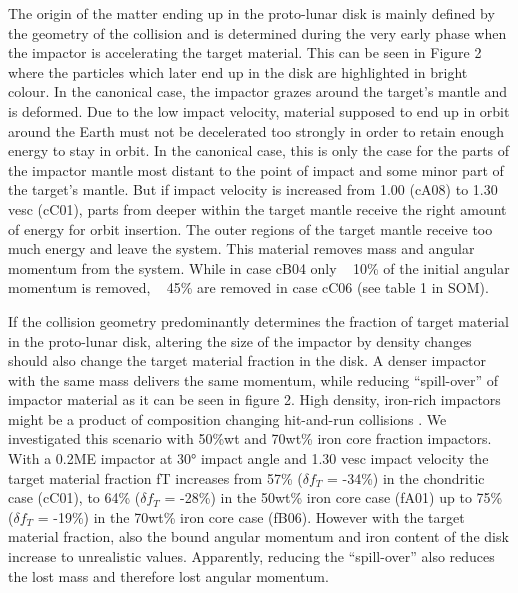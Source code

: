 The origin of the matter ending up in the proto-lunar disk is mainly defined by the geometry of the collision and is determined during the very early phase when the impactor is accelerating the target material. This can be seen in Figure 2 where the particles which later end up in the disk are highlighted in bright colour. In the canonical case, the impactor grazes around the target's mantle and is deformed. Due to the low impact velocity, material supposed to end up in orbit around the Earth must not be decelerated too strongly in order to retain enough energy to stay in orbit. In the canonical case, this is only the case for the parts of the impactor mantle most distant to the point of impact and some minor part of the target's mantle. But if impact velocity is increased from 1.00 (cA08) to 1.30 vesc (cC01), parts from deeper within the target mantle receive the right amount of energy for orbit insertion. The outer regions of the target mantle receive too much energy and leave the system. This material removes mass and angular momentum from the system. While in case cB04 only ~ 10\% of the initial angular momentum is removed, ~ 45\% are removed in case cC06 (see table 1 in SOM).

If the collision geometry predominantly determines the fraction of target material in the proto-lunar disk, altering the size of the impactor by density changes should also change the target material fraction in the disk. A denser impactor with the same mass delivers the same momentum, while reducing “spill-over” of impactor material as it can be seen in figure 2. High density, iron-rich impactors might be a product of composition changing hit-and-run collisions \citep{Asphaug:2010p3539}. We investigated this scenario with 50\%wt and 70wt\% iron core fraction impactors. With a 0.2ME impactor at 30° impact angle and 1.30 vesc impact velocity the target material fraction fT increases from 57\% ($\delta f_{T}$ = -34\%) in the chondritic case (cC01), to 64\% ($\delta f_{T}$ = -28\%) in the 50wt\% iron core case (fA01) up to 75\% ($\delta f_{T}$ = -19\%) in the 70wt\% iron core case (fB06). However with the target material fraction, also the bound angular momentum and iron content of the disk increase to unrealistic values. Apparently, reducing the “spill-over” also reduces the lost mass and therefore lost angular momentum. 

